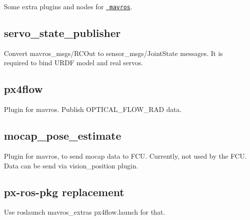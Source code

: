 Some extra plugins and nodes for \href{https://github.com/mavlink/mavros}{\texttt{ mavros}}.

\subsection*{servo\+\_\+state\+\_\+publisher }

Convert {\ttfamily mavros\+\_\+msgs/\+R\+C\+Out} to {\ttfamily sensor\+\_\+msgs/\+Joint\+State} messages. It is required to bind U\+R\+DF model and real servos.

\subsection*{px4flow }

Plugin for mavros. Publish {\ttfamily O\+P\+T\+I\+C\+A\+L\+\_\+\+F\+L\+O\+W\+\_\+\+R\+AD} data.

\subsection*{mocap\+\_\+pose\+\_\+estimate }

Plugin for mavros, to send mocap data to F\+CU. Currently, not used by the F\+CU. Data can be send via {\ttfamily vision\+\_\+position} plugin.

\subsection*{px-\/ros-\/pkg replacement }

Use {\ttfamily roslaunch mavros\+\_\+extras px4flow.\+launch} for that. 